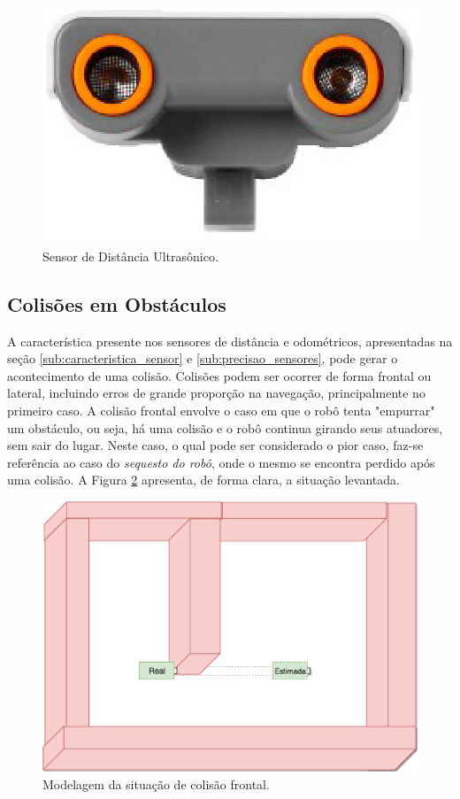   \begin{figure}[H]
    \centering
    \includegraphics[scale=0.5]{figuras/ultrasonic.eps}
    \caption{Sensor de Distância Ultrasônico.}
    \label{img:sonar_utilizado}
  \end{figure}


\subsection{Colisões em Obstáculos}
\label{sub:colisao}

A característica presente nos sensores de distância e odométricos, apresentadas na seção \ref{sub:caracteristica_sensor} e
\ref{sub:precisao_sensores}, pode gerar o acontecimento de uma colisão. Colisões podem ser ocorrer de forma frontal ou lateral,
incluindo erros de grande proporção na navegação, principalmente no primeiro caso. A colisão frontal envolve o caso em que o robô
tenta "empurrar" um obstáculo, ou seja, há uma colisão e o robô continua girando seus atuadores, sem sair do lugar. Neste caso,
o qual pode ser considerado o pior caso, faz-se referência ao caso do \textit{sequesto do robô}, onde o mesmo se encontra perdido
após uma colisão. A Figura \ref{img:colisao_frontal} apresenta, de forma clara, a situação levantada.

\begin{figure}[H]
  \centering
  \includegraphics[scale=0.5]{figuras/colisao_frontal.eps}
  \caption{Modelagem da situação de colisão frontal.}
  \label{img:colisao_frontal}
\end{figure}

